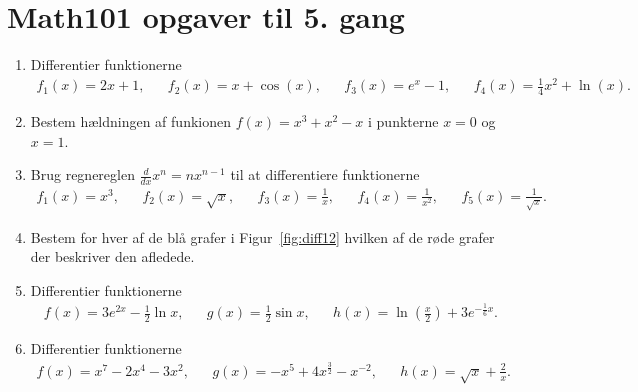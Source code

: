 \newpage
\section{Math101 opgaver til 5. gang}
\begin{enumerate}
	\item Differentier funktionerne 
	\begin{align*}
	f_1(x)=2x+1,&& f_2(x)=x+\cos(x),&& f_3(x)=e^x-1,&&f_4(x)=\frac{1}{4}x^2+\ln(x).
	\end{align*}
	
	
	\item Bestem hældningen af funkionen $f(x)=x^3+x^2-x$ i punkterne $x=0$ og $x=1$.

	\item Brug regnereglen $\frac{d}{dx} x^n=nx^{n-1}$ til at differentiere funktionerne
	\begin{align*}
	f_1(x)=x^3,&& f_2(x)=\sqrt{x},&& f_3(x)=\frac{1}{x},&&f_4(x)=\frac{1}{x^2},&&f_5(x)=\frac{1}{\sqrt{x}}.
	\end{align*}
	\item \label{it:diff12} Bestem for hver af de blå grafer i Figur~\ref{fig:diff12} hvilken af de røde grafer der beskriver den afledede.
	
	\item Differentier funktionerne 
	\begin{align*}
	f(x)=3e^{2x}-\frac{1}{2}\ln x,&& g(x)=\frac{1}{2}\sin x,&& h(x)=\ln(\frac{x}{2})+3e^{-\frac{1}{6}x}.
	\end{align*}
	
	\item Differentier funktionerne
	\begin{align*}
	f(x)=x^7-2x^4-3x^2,&&g(x)=-x^5+4x^{\frac{3}{2}}-x^{-2},&&h(x)=\sqrt{x}+\frac{2}{x}.
	\end{align*}
	
	\begin{figure}
		\centering
		

\end{figure}
\end{enumerate}
